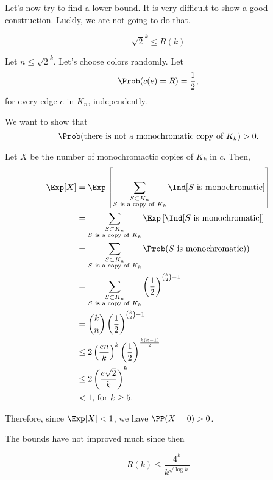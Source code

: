 
Let's now try to find a lower bound.
It is very difficult to show a good construction.
Luckly, we are not going to do that.

\begin{thm}[Erd\H{o}s, 1947]
	\[
		\left.\sqrt{2}\right.^k \le R(k)
	\]
\end{thm}

\begin{dem}
	Let $n \le \left.\sqrt{2}\right.^k$.
	Let's choose colors randomly. Let \[
		\Prob(c(e) = R) = \frac{1}{2},
	\]
	for every edge $e$ in $K_n$, independently.

	We want to show that \[
		\Prob(\text{there is not a monochromatic copy of $K_k$}) > 0.
	\]

	Let $X$ be the number of monochromactic copies of $K_k$ in $c$. Then, 
	\begin{align*}
		\Exp[X] &= \Exp\left[\sum_{\substack{S \subset K_n\\S\ \text{is a copy of}\ K_k}} \Ind[S\ \text{is monochromatic}]\right]\\
			    &= \sum_{\substack{S \subset K_n\\S\ \text{is a copy of}\ K_k}} \Exp\left[\Ind[S\ \text{is monochromatic}]\right]\\
				&= \sum_{\substack{S \subset K_n\\S\ \text{is a copy of}\ K_k}} \Prob(S\ \text{is monochromatic}))\\
				&= \sum_{\substack{S \subset K_n\\S\ \text{is a copy of}\ K_k}} \left(\frac{1}{2}\right)^{\binom{k}{2} - 1}\\
				&= \binom{k}{n} \left(\frac{1}{2}\right)^{\binom{k}{2} - 1}\\
				&\le 2 \left(\frac{en}{k}\right)^k \left(\frac{1}{2}\right)^{\frac{k(k-1)}{2}}\\
				&\le 2 \left(\frac{e\sqrt{2}}{k}\right)^k \\
				&< 1\text{, for $k \ge 5$.}
	\end{align*}

	Therefore, since $\Exp[X] < 1$, we have $\PP(X = 0) > 0$.
\end{dem}

The bounds have not improved much since then 

\begin{thm}[Conlon, 2009]
	\[
		R(k) \le \frac{4^k}{k^{\sqrt{\log k }}}
	\]
\end{thm}

